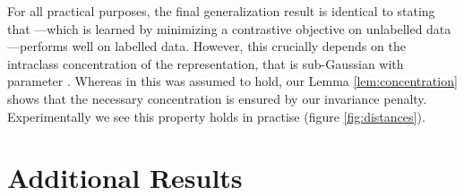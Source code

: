\documentclass{article}
\begin{document}
For all practical purposes, the final generalization result is identical to \citep{saunshi2019theoretical} stating that ---which is learned by minimizing a contrastive objective on unlabelled data---performs well on labelled data. However, this crucially depends on the intraclass concentration of the representation, that  is sub-Gaussian with parameter . Whereas in \citep{saunshi2019theoretical} this was assumed to hold, our Lemma \ref{lem:concentration} shows that the necessary concentration is ensured by our invariance penalty. Experimentally we see this property holds in practise (figure \ref{fig:distances}).




 \section{Additional Results} \label{sec:gen-theory_app}
\end{document}
